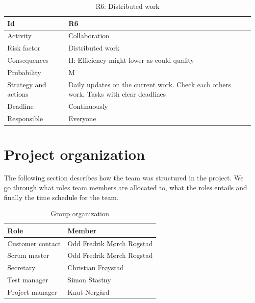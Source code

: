 \documentclass[11pt]{book}
\begin{document}
\begin{table}[H]
\centering
\begin{tabular}{ l  p{11cm} }
    Id                      & R6                                                                          \\ \hline
    Activity                & Collaboration                                                               \\ \hline
    Risk factor             & Distributed work                                                            \\ \hline
    Consequences            & H: Efficiency might lower as could quality                                  \\ \hline
    Probability             & M                                                                           \\ \hline
    Strategy and actions    & Daily updates on the current work. Check each others work. Tasks with 
                              clear deadlines                                                             \\ \hline
    Deadline                & Continuously                                                                \\ \hline
    Responsible             & Everyone                                                                    \\ 
\end{tabular}
\label{tab:risk_6}
\caption{R6: Distributed work}
\end{table}

\section{Project organization}
The following section describes how the team was structured in the project. We go through what roles team members are allocated to, what the roles entails and finally the time schedule for the team.

\begin{table}[H]
\centering
    \begin{tabular}{ l  p{11cm}  }
    Role                    & Member                                                                      \\ \hline
    Customer contact        & Odd Fredrik Mørch Rogstad                                                   \\ \hline
    Scrum master            & Odd Fredrik Mørch Rogstad                                                   \\ \hline
    Secretary               & Christian Frøystad                                                          \\ \hline
    Test manager            & Simon Stastny                                                               \\ \hline
    Project manager         & Knut Nergård                                                                \\
\end{tabular}
\label{tab:org}
\caption{Group organization}
\end{table}
\end{document}
